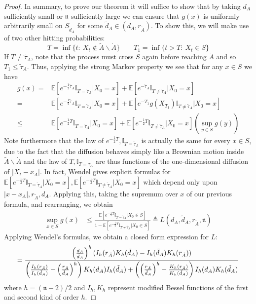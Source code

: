 \documentclass[english, aip, jcp, priprint, graphicx,floatfix]{revtex4-1}
\theoremstyle{plain}
\theoremstyle{definition}
\theoremstyle{plain}
\newcommand{\dimension}{{\mathfrak{n}}}
\newcommand{\indicatorf}[1]{\mathbb{I}_{#1}}
\begin{document}
\begin{proof}
In summary, to prove our theorem it will suffice to show that by taking $d_A$ sufficiently small or $\dimension$ sufficiently large we can ensure that $g(x)$ is uniformly arbitrarily small on $S_{\tilde d_A}$ for some $\tilde d_A \in (d_A,r_{\tilde A})$.  To show this, we will make use of two other hitting probabilities:
\[
T =\inf \{t:\ X_t \notin \tilde A \backslash \dot A\} 
\qquad
T_1 =\inf \{t>T:\ X_t \in S\} 
\]
If $T\neq \tilde \tau_A$, note that the process must cross $S$ again before reaching $\dot A$ and so $T_1 \leq \tilde \tau_A$.  Thus, applying the strong Markov property we see that for any $x\in S$ we have
\begin{align*}
g(x) = &\mathbb{E}[e^{-\frac{1}{2}\tilde \tau_A}\indicatorf{T=\tilde \tau_A}|X_0=x]+
                    \mathbb{E}[e^{-\tilde \tau_A}\indicatorf{T\neq\tilde \tau_A}|X_0=x]\\
     = & \mathbb{E}[e^{-\frac{1}{2}\tilde \tau_A}\indicatorf{T=\tilde \tau_A}|X_0=x]+
                    \mathbb{E}[e^{-T_1}g(X_{T_1})\indicatorf{T\neq\tilde \tau_A}|X_0=x]\\
     \leq & \mathbb{E}[e^{-\frac{1}{2}T}\indicatorf{T=\tilde \tau_A}|X_0=x]+
                    \mathbb{E}[e^{-\frac{1}{2}T}\indicatorf{T\neq\tilde \tau_A}|X_0=x]\left(\sup_{y\in S} g(y)\right)
\end{align*}
Note furthermore that the law of $e^{-\frac{1}{2}T},\indicatorf{T=\tilde \tau_A}$ is actually the same for every $x\in S$, due to the fact that the diffusion behaves simply like a Brownian motion inside $\tilde A \backslash \dot A$ and the law of $T,\indicatorf{T=\tau_A}$ are thus functions of the one-dimensional diffusion of $|X_t-x_A|$.  In fact, Wendel\cite{Wendel1980-sj} gives explicit formulas for $\mathbb{E}[e^{-\frac{1}{2}T}\indicatorf{T=\tilde \tau_A}|X_0=x],\mathbb{E}[e^{-\frac{1}{2}T}\indicatorf{T\neq\tilde \tau_A}|X_0=x]$ which depend only upon $|x-x_A|,r_{\tilde{A}},d_A$.  Applying this, taking the supremum over $x$ of our previous formula, and rearranging, we obtain
\begin{align*}
\sup_{x\in S} g(x) &\leq \frac{\mathbb{E}[e^{-\frac{1}{2}T}\indicatorf{T=\tilde \tau_A}|X_0\in S]}{1-\mathbb{E}[e^{-\frac{1}{2}T}\indicatorf{T\neq\tilde \tau_A}|X_0\in S]} \triangleq L(d_A,\tilde d_A,r_{\tilde A},\dimension)
\end{align*}
Applying Wendel's formulas, we obtain a closed form expression for $L$:
\[
=\frac{\left( \frac{d_A}{\tilde{d}_A} \right)^h (I_h (
r_{\tilde{A}}) K_h ( \tilde{d}_A) - I_h ( \tilde{d}_A) K_h (
r_{\tilde{A}}))}{
    \left( \frac{I_h ( r_{\tilde{A}})}{I_h ( \tilde{d}_A)} - \left(
\frac{r_{\tilde{A}}}{\tilde{d}_A} \right)^h  \right)
K_h ( d_A) I_h ( \tilde{d}_A)+ 
    \left( \left( \frac{r_{\tilde{A}}}{\tilde{d}_A}
\right)^h  - \frac{K_h ( r_{\tilde{A}})}{K_h ( \tilde{d}_A)} \right) I_h (d_A)K_h ( \tilde{d}_A)}\\
\]
where $h=(\dimension-2)/2$ and $I_h,K_h$ represent modified Bessel functions of the first and second kind of order $h$.  
 

\end{proof}
\end{document}
